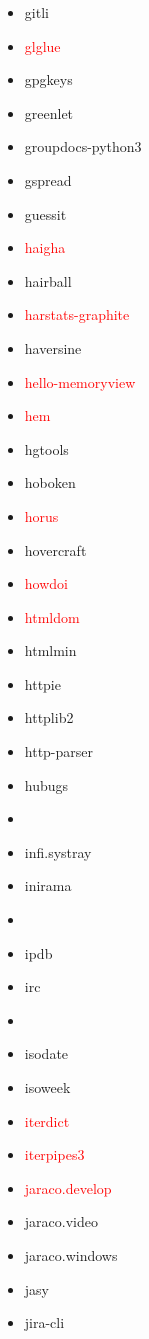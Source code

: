 \documentclass{l4proj}
\begin{document}
\begin{appendices}
{\begin{itemize}
\item gitli
\item\textcolor{red}{glglue}
\item gpgkeys
\item greenlet
\item groupdocs-python3
\item gspread
\item guessit
\item\textcolor{red}{haigha}
\item hairball
\item\textcolor{red}{harstats-graphite}
\end{itemize}
}%
\noindent\parbox[t]{0.32\textwidth}{\raggedright%
\begin{itemize}
\item haversine
\item\textcolor{red}{hello-memoryview}
\item\textcolor{red}{hem}
\item hgtools
\item hoboken
\item\textcolor{red}{horus}
\item hovercraft
\item\textcolor{red}{howdoi}
\item\textcolor{red}{htmldom}
\item htmlmin
\item httpie
\item httplib2
\item http-parser
\item hubugs
\item\textcolor{red}{}
\item infi.systray
\item inirama
\item {}
\item ipdb
\item irc
\item\textcolor{red}{}
\item isodate
\item isoweek
\item\textcolor{red}{iterdict}
\item\textcolor{red}{iterpipes3}
\item\textcolor{red}{jaraco.develop}
\item jaraco.video
\item jaraco.windows
\item jasy
\item jira-cli

\end{itemize}}
\end{appendices}
\end{document}
